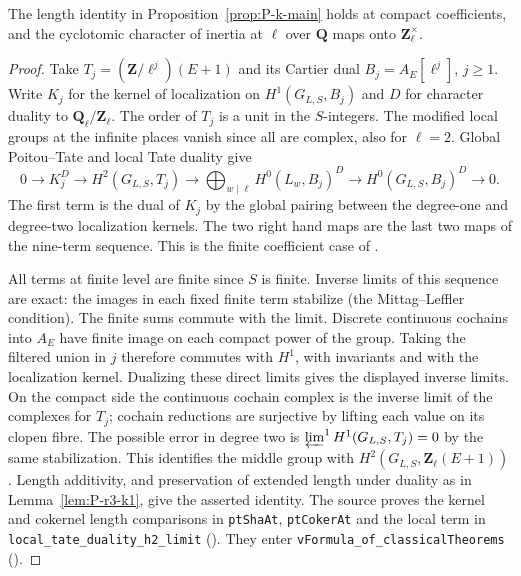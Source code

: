 \begin{lemma}\label{lem:P-r3-k8}
The length identity in Proposition~\ref{prop:P-k-main} holds at compact
coefficients, and the cyclotomic character of inertia at $\ell$ over
$\mathbf Q$ maps onto $\mathbf Z_\ell^\times$.
\end{lemma}
\begin{proof}
Take $T_j=(\mathbf Z/\ell^j)(E+1)$ and its Cartier dual $B_j=A_E[\ell^j]$,
$j\ge1$. Write $K_j$ for the kernel of localization on $H^1(G_{L,S},B_j)$
and $D$ for character duality to $\mathbf Q_\ell/\mathbf Z_\ell$.
The order of $T_j$ is a unit in the $S$-integers. The modified local
groups at the infinite places vanish since all are complex, also for
$\ell=2$. Global Poitou--Tate and local Tate duality give
\[
 0\longrightarrow K_j^D\longrightarrow H^2(G_{L,S},T_j)
 \longrightarrow\bigoplus_{w\mid\ell} H^0(L_w,B_j)^D
 \longrightarrow H^0(G_{L,S},B_j)^D\longrightarrow0 .
\]
The first term is the dual of $K_j$ by the global pairing between the
degree-one and degree-two localization kernels. The two right hand maps
are the last two maps of the nine-term sequence. This is the finite
coefficient case of \cite[I.2, Corollary 2.3 and I.4, Theorem 4.10]{S-Milne}.

All terms at finite level are finite since $S$ is finite. Inverse limits
of this sequence are exact: the images in each fixed finite term
stabilize (the Mittag--Leffler condition). The finite sums commute with
the limit. Discrete continuous cochains into $A_E$ have finite image on
each compact power of the group. Taking the filtered union in $j$
therefore commutes with $H^1$, with invariants and with the localization
kernel. Dualizing these direct limits gives the displayed inverse limits.
On the compact side the continuous cochain complex is the inverse limit
of the complexes for $T_j$; cochain reductions are surjective by lifting
each value on its clopen fibre. The possible error in degree two is
$\varprojlim^1 H^1(G_{L,S},T_j)=0$ by the same stabilization. This
identifies the middle group with $H^2(G_{L,S},\mathbf Z_\ell(E+1))$.
Length additivity, and preservation of extended length under duality
as in Lemma~\ref{lem:P-r3-k1}, give the asserted identity. The source
proves the kernel and cokernel length comparisons in \nolinkurl{ptShaAt},
\nolinkurl{ptCokerAt} and the local term in \nolinkurl{local_tate_duality_h2_limit}
().
They enter \nolinkurl{vFormula_of_classicalTheorems}
().


\end{proof}
